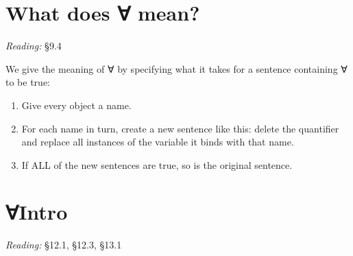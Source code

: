 \documentclass[12pt]{extarticle}
\begin{document}
\begin{multicols*}{3}
\begin{minipage}{\columnwidth}
\end{minipage}
 
 
 
\section{What does ∀ mean?}
 
\emph{Reading:} §9.4
 
We give the meaning of ∀ by specifying what it takes for a sentence containing ∀ to be true:
 
\begin{enumerate}
 
\item Give every object a name.
 
\item For each name in turn, create a new sentence like this: delete the quantifier and replace all instances of the variable it binds with that name.
 
\item If ALL of the new sentences are true, so is the original sentence.
 
\end{enumerate}
 
 
 
\section{∀Intro}
 
\emph{Reading:} §12.1, §12.3, §13.1
 

\end{multicols*}
\end{document}
